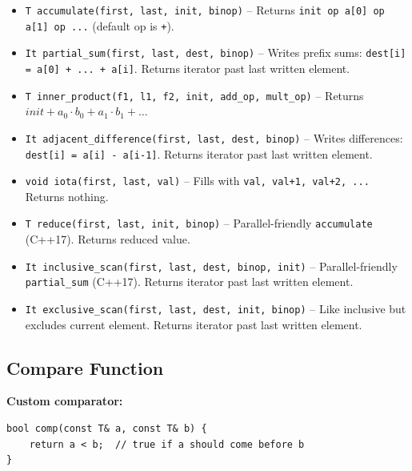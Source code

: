 \begin{itemize}
\item \texttt{T accumulate(first, last, init, binop)} -- Returns \texttt{init op a[0] op a[1] op ...} (default op is \texttt{+}).
\item \texttt{It partial\_sum(first, last, dest, binop)} -- Writes prefix sums: \texttt{dest[i] = a[0] + ... + a[i]}. Returns iterator past last written element.
\item \texttt{T inner\_product(f1, l1, f2, init, add\_op, mult\_op)} -- Returns $init + a_0 \cdot b_0 + a_1 \cdot b_1 + \ldots$
\item \texttt{It adjacent\_difference(first, last, dest, binop)} -- Writes differences: \texttt{dest[i] = a[i] - a[i-1]}. Returns iterator past last written element.
\item \texttt{void iota(first, last, val)} -- Fills with \texttt{val, val+1, val+2, ...} Returns nothing.
\item \texttt{T reduce(first, last, init, binop)} -- Parallel-friendly \texttt{accumulate} (C++17). Returns reduced value.
\item \texttt{It inclusive\_scan(first, last, dest, binop, init)} -- Parallel-friendly \texttt{partial\_sum} (C++17). Returns iterator past last written element.
\item \texttt{It exclusive\_scan(first, last, dest, init, binop)} -- Like inclusive but excludes current element. Returns iterator past last written element.
\end{itemize}

\subsection{Compare Function}
\begin{mdframed}[backgroundcolor=blue!20]
\textbf{Custom comparator:}
\vspace{-8pt}
\begin{verbatim}
bool comp(const T& a, const T& b) {
    return a < b;  // true if a should come before b
}
\end{verbatim}
\end{mdframed}

\vfill \null
\columnbreak
